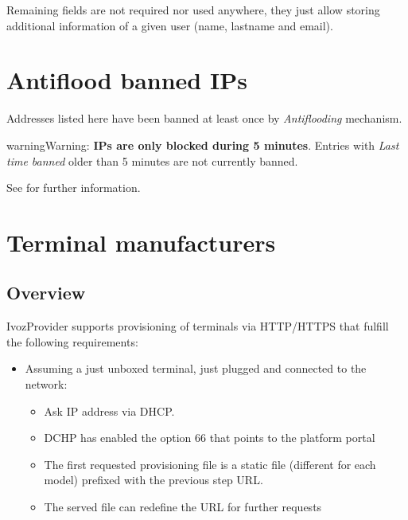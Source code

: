 \documentclass[letterpaper,10pt,english]{sphinxmanual}
\begin{document}
Remaining fields are not required nor used anywhere, they just allow storing additional information of a given user
(name, lastname and email).


\section{Antiflood banned IPs}
\label{administration_portal/platform/antiflood_banned_ips:antiflood-banned-ips}\label{administration_portal/platform/antiflood_banned_ips::doc}\label{administration_portal/platform/antiflood_banned_ips:id1}
Addresses listed here have been banned at least once by \emph{Antiflooding} mechanism.

\begin{notice}{warning}{Warning:}
\textbf{IPs are only blocked during 5 minutes}. Entries with \emph{Last time banned} older than 5 minutes are not
currently banned.
\end{notice}

See {\hyperref[security_and_maintenance/security/antiflooding:sip\string-antiflooding]{}} for further information.


\section{Terminal manufacturers}
\label{administration_portal/platform/terminal_manufacturers:terminal-manufacturers}\label{administration_portal/platform/terminal_manufacturers::doc}\label{administration_portal/platform/terminal_manufacturers:provisioning}

\subsection{Overview}
\label{administration_portal/platform/terminal_manufacturers:overview}
IvozProvider supports provisioning of terminals via HTTP/HTTPS that fulfill the
following requirements:
\begin{itemize}
\item {} 
Assuming a just unboxed terminal, just plugged and connected to the network:
\begin{itemize}
\item {} 
Ask IP address via DHCP.

\item {} 
DCHP has enabled the option 66 that points to the platform portal

\item {} 
The first requested provisioning file is a static file (different for each
model) prefixed with the previous step URL.

\item {} 
The served file can redefine the URL for further requests

\end{itemize}

\end{itemize}
\end{document}
